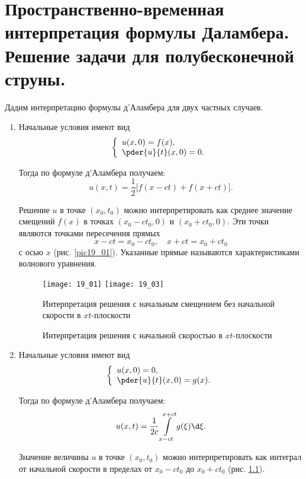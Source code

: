 \chapter{Пространственно-временная интерпретация формулы Даламбера. Решение
задачи для полубесконечной струны.}

Дадим интерпретацию формулы д'Аламбера для двух частных случаев.
\begin{enumerate}
    \item Начальные условия имеют вид
    \[
        \left\{ \begin{array}{l}
            u(x, 0) = f(x), \\
            \ds \pder{u}{t}(x, 0) = 0.
        \end{array} \right.
    \]
    
    Тогда по формуле д'Аламбера получаем:
    \[
        u(x, t) = \frac{1}{2}\bigl[f(x - ct) + f(x + ct)\bigr].
    \]
    
    Решение \( u \) в точке \( (x_0, t_0) \) можно интерпретировать как среднее
    значение смещений \( f(x) \) в точках \( (x_0 - ct_0, 0) \) и
    \( (x_0 + ct_0, 0) \). Эти точки являются точками пересечения прямых
    \[
        x - ct = x_0 - ct_0, \quad x + ct = x_0 + ct_0
    \]
    с осью \( x \) (рис. \ref{pic19_01}). Указанные прямые называются характеристиками волнового
    уравнения.

    \begin{figure}[h!]
        \texttt{[image: 19\_01]}\hfill
        \texttt{[image: 19\_03]}
        \parbox{.47\textwidth}{\caption{Интерпретация решения с начальным
        смещением без начальной скорости в \( xt \)-плоскости} \label{pic19_01}}
        \hfill
        \parbox{.47\textwidth}{\caption{Интерпретация решения с начальной
        скоростью в \( xt \)-плоскости} \label{pic19_03}}
    \end{figure}

    \item Начальные условия имеют вид
    \[
        \left\{ \begin{array}{l}
            u(x, 0) = 0, \\
            \ds \pder{u}{t}(x, 0) = g(x).
        \end{array} \right.
    \]
    
    Тогда по формуле д'Аламбера получаем:
    \[
        u(x, t) = \frac{1}{2c}\int\limits_{x - ct}^{x + ct} g(\xi)\d\xi.
    \]
    
    Значение величины \( u \) в точке \( (x_0, t_0) \) можно интерпретировать
    как интеграл от начальной скорости в пределах от \( x_0 - ct_0 \) до
    \( x_0 + ct_0 \) (рис. \ref{pic19_03}).
\end{enumerate}

